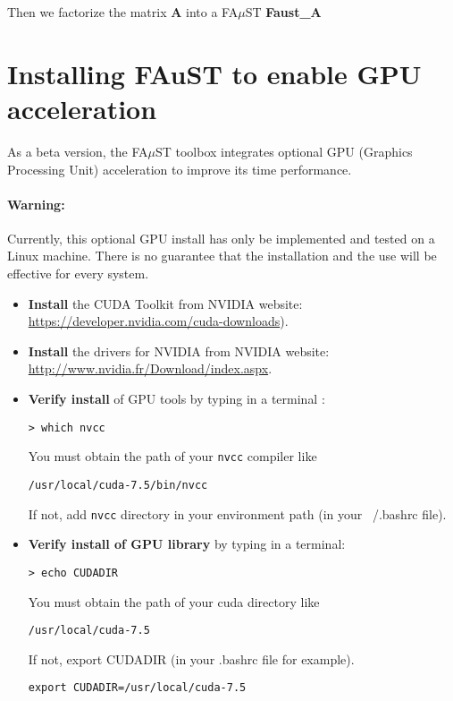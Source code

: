 \lstset{style=customBash}

Then we factorize the matrix \textbf{A} into a FA$\mu$ST \textbf{Faust\_A}



\section{Installing FAuST to enable GPU acceleration}\label{sec:OptionalGPU}
As a beta version, the FA$\mu$ST toolbox integrates optional GPU (Graphics Processing Unit) acceleration to improve its time performance.
\paragraph{Warning:} Currently, this optional GPU install has only be implemented and tested on a Linux machine. There is no guarantee that the installation and the use will be effective for every system.

\begin{itemize}
\item \textbf{Install} the CUDA Toolkit from NVIDIA website:\\
\url{https://developer.nvidia.com/cuda-downloads}).
\item \textbf{Install} the drivers for NVIDIA from NVIDIA website:\\ \url{http://www.nvidia.fr/Download/index.aspx}.
\item \textbf{Verify install} of GPU tools by typing in a terminal :
\lstset{style=customBash} 
\begin{lstlisting}
> which nvcc
\end{lstlisting}
You must obtain the path of your \texttt{nvcc} compiler like 
\begin{lstlisting}
/usr/local/cuda-7.5/bin/nvcc
\end{lstlisting}
If not, add \texttt{nvcc} directory in your environment path (in your ~/.bashrc file).

\item \textbf{Verify install of GPU library} by typing in a terminal: 
\begin{lstlisting}
> echo CUDADIR
\end{lstlisting}
You must obtain the path of your cuda directory like
\begin{lstlisting}
/usr/local/cuda-7.5
\end{lstlisting}
If not, export CUDADIR (in your .bashrc file for example).
\begin{lstlisting}
export CUDADIR=/usr/local/cuda-7.5
\end{lstlisting}

		
	   
\end{itemize}

